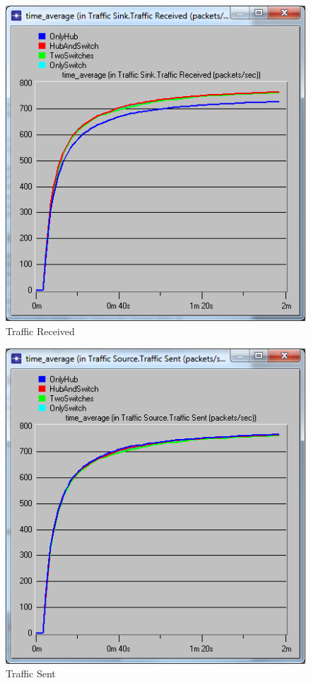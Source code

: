 \documentclass[letter,12pt]{article}
\begin{document}
\begin{figure}[h]
	\centering
	\includegraphics[scale=0.6]{Traffic_Received.png}
	\caption{Traffic Received}
	\label{Traffic_Received}
\end{figure}

\begin{figure}[h]
	\centering
	\includegraphics[scale=0.6]{Traffic_Sent.png}
	\caption{Traffic Sent}
	\label{Traffic_Sent}
\end{figure}
\end{document}
